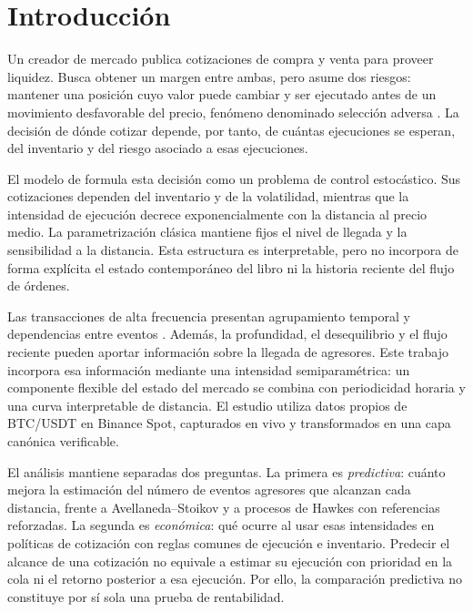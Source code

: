 \chapter{Introducción}

Un creador de mercado publica cotizaciones de compra y venta para proveer liquidez. Busca obtener un margen entre ambas, pero asume dos riesgos: mantener una posición cuyo valor puede cambiar y ser ejecutado antes de un movimiento desfavorable del precio, fenómeno denominado selección adversa \citep{GlostenMilgrom1985}. La decisión de dónde cotizar depende, por tanto, de cuántas ejecuciones se esperan, del inventario y del riesgo asociado a esas ejecuciones.

El modelo de \citet{AvellanedaStoikov2008} formula esta decisión como un problema de control estocástico. Sus cotizaciones dependen del inventario y de la volatilidad, mientras que la intensidad de ejecución decrece exponencialmente con la distancia al precio medio. La parametrización clásica mantiene fijos el nivel de llegada y la sensibilidad a la distancia. Esta estructura es interpretable, pero no incorpora de forma explícita el estado contemporáneo del libro ni la historia reciente del flujo de órdenes.

Las transacciones de alta frecuencia presentan agrupamiento temporal y dependencias entre eventos \citep{BacryHawkes2015}. Además, la profundidad, el desequilibrio y el flujo reciente pueden aportar información sobre la llegada de agresores. Este trabajo incorpora esa información mediante una intensidad semiparamétrica: un componente flexible del estado del mercado se combina con periodicidad horaria y una curva interpretable de distancia. El estudio utiliza datos propios de BTC/USDT en Binance Spot, capturados en vivo y transformados en una capa canónica verificable.

El análisis mantiene separadas dos preguntas. La primera es \emph{predictiva}: cuánto mejora la estimación del número de eventos agresores que alcanzan cada distancia, frente a Avellaneda--Stoikov y a procesos de Hawkes con referencias reforzadas. La segunda es \emph{económica}: qué ocurre al usar esas intensidades en políticas de cotización con reglas comunes de ejecución e inventario. Predecir el alcance de una cotización no equivale a estimar su ejecución con prioridad en la cola ni el retorno posterior a esa ejecución. Por ello, la comparación predictiva no constituye por sí sola una prueba de rentabilidad.

